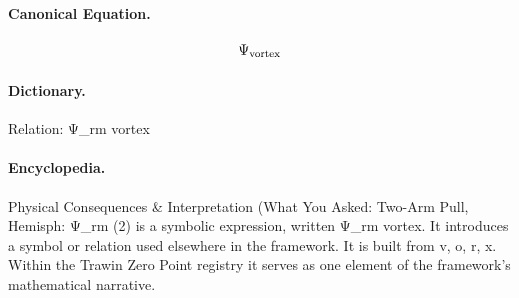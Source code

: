 \paragraph{Canonical Equation.}
\[
\Psi_{\rm vortex}
\]

\paragraph{Dictionary.}
Relation: Ψ\_rm vortex

\paragraph{Encyclopedia.}
Physical Consequences \& Interpretation (What You Asked: Two-Arm Pull, Hemisph: Ψ\_rm (2) is a symbolic expression, written Ψ\_rm vortex. It introduces a symbol or relation used elsewhere in the framework. It is built from v, o, r, x. Within the Trawin Zero Point registry it serves as one element of the framework's mathematical narrative.
